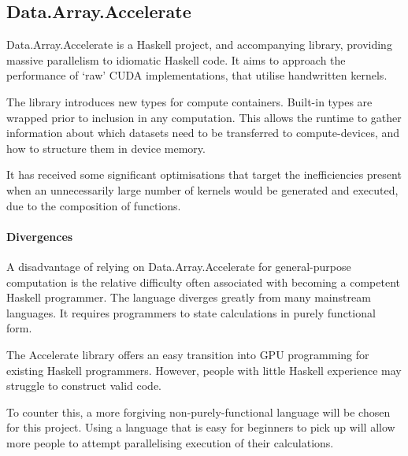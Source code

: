 \subsection{Data.Array.Accelerate}

Data.Array.Accelerate is a Haskell project\cite{daa}, and accompanying library\cite{daalib}, providing massive parallelism to idiomatic Haskell code. It aims to approach the performance of `raw' \ac{CUDA} implementations, that utilise handwritten kernels.

The library introduces new types for compute containers. Built-in types are wrapped prior to inclusion in any computation. This allows the runtime to gather information about which datasets need to be transferred to compute-devices, and how to structure them in device memory.

It has received some significant optimisations\cite{daaopt} that target the inefficiencies present when an unnecessarily large number of kernels would be generated and executed, due to the composition of functions.

\paragraph*{Divergences}
A disadvantage of relying on Data.Array.Accelerate for general-purpose computation is the relative difficulty often associated with becoming a competent Haskell programmer. The language diverges greatly from many mainstream languages.  It requires programmers to state calculations in purely functional form.

The Accelerate library offers an easy transition into \ac{GPU} programming for existing Haskell programmers. However, people with little Haskell experience may struggle to construct valid code.

 To counter this, a more forgiving non-purely-functional language will be chosen for this project. Using a language that is easy for beginners to pick up will allow more people to attempt parallelising execution of their calculations.
